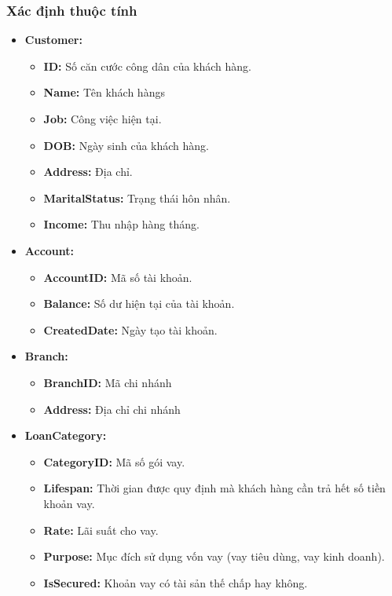 \documentclass{article}
\begin{document}
\subsubsection{Xác định thuộc tính}
\begin{itemize}
    \item \textbf{Customer:}
    \begin{itemize}
        \item \textbf{ID:} Số căn cước công dân của khách hàng.
        \item \textbf{Name:} Tên khách hàngs 
        \item \textbf{Job:} Công việc hiện tại.
        \item \textbf{DOB:} Ngày sinh của khách hàng.
        \item \textbf{Address:} Địa chỉ. 
        \item \textbf{MaritalStatus:} Trạng thái hôn nhân.
        \item \textbf{Income:} Thu nhập hàng tháng.
        
    \end{itemize}
    \item \textbf{Account:}
    \begin{itemize}
        \item \textbf{AccountID:} Mã số tài khoản.
        \item \textbf{Balance:} Số dư hiện tại của tài khoản.
        \item \textbf{CreatedDate:} Ngày tạo tài khoản.
    \end{itemize}
    
    \item \textbf{Branch:}
    \begin{itemize}
        \item \textbf{BranchID:} Mã chi nhánh
        \item \textbf{Address:} Địa chỉ chi nhánh
    \end{itemize}
        
    \item \textbf{LoanCategory:}
    \begin{itemize}
        \item \textbf{CategoryID:} Mã số gói vay.
        \item \textbf{Lifespan:} Thời gian được quy định mà khách hàng cần trả hết số tiền khoản vay.
        \item \textbf{Rate:} Lãi suất cho vay.
        \item \textbf{Purpose:} Mục đích sử dụng vốn vay (vay tiêu dùng, vay kinh doanh).
        \item \textbf{IsSecured:} Khoản vay có tài sản thế chấp hay không.
    \end{itemize}
    

\end{itemize}
\end{document}
